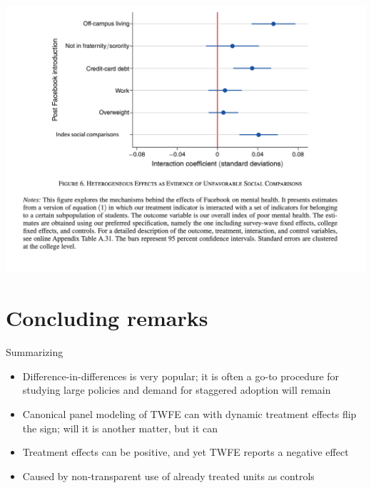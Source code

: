 \documentclass{beamer}
\begin{document}
\begin{frame}
\begin{center}
\includegraphics[scale=0.35]{./lecture_includes/facebook_7}
\end{center}
\end{frame}










\section{Concluding remarks}


\begin{frame}{Summarizing}

\begin{itemize}

\item Difference-in-differences is very popular; it is often a go-to procedure for studying large policies and demand for staggered adoption will remain
\item Canonical panel modeling of TWFE can with dynamic treatment effects flip the sign; will it is another matter, but it can
\item Treatment effects can be positive, and yet TWFE reports a negative effect
\item Caused by non-transparent use of already treated units as controls

\end{itemize}

\end{frame}
\end{document}
